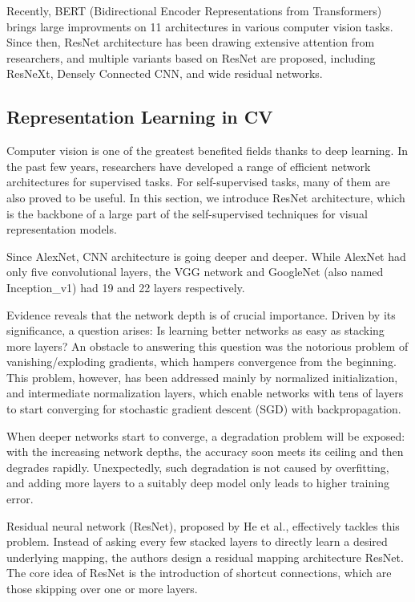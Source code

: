 \documentclass[conference]{IEEEtran}
\begin{document}
Recently, BERT (Bidirectional Encoder Representations from Transformers) brings large improvments on 11 architectures in various computer vision tasks. Since then, ResNet architecture has been drawing extensive attention from researchers, and multiple variants based on ResNet are proposed, including ResNeXt, Densely Connected CNN, and wide residual networks.

\subsection{Representation Learning in CV}
Computer vision is one of the greatest benefited fields thanks to deep learning. In the past few years, researchers have developed a range of efficient network architectures for supervised tasks.
For self-supervised tasks, many of them are also proved to be useful. In this section, we introduce ResNet architecture, which is the backbone of a large part of the self-supervised techniques for visual representation models.

Since AlexNet, CNN architecture is going deeper and deeper. While AlexNet had only five convolutional layers, the VGG network and GoogleNet (also named Inception\_v1) had 19 and 22 layers respectively.

Evidence reveals that the network depth is of crucial importance. Driven by its significance, a question arises: Is learning better networks as easy as stacking more layers?
An obstacle to answering this question was the notorious problem of vanishing/exploding gradients, which hampers convergence from the beginning. 
This problem, however, has been addressed mainly by normalized initialization, and intermediate normalization layers, which enable networks with tens of layers to start converging for stochastic gradient descent (SGD) with backpropagation.

When deeper networks start to converge, a degradation problem will be exposed: with the increasing network depths, the accuracy soon meets its ceiling and then degrades rapidly.
Unexpectedly, such degradation is not caused by overfitting, and adding more layers to a suitably deep model only leads to higher training error.

Residual neural network (ResNet), proposed by He et al., effectively tackles this problem.
Instead of asking every few stacked layers to directly learn a desired underlying mapping, the authors design a residual mapping architecture ResNet.
The core idea of ResNet is the introduction of shortcut connections, which are those skipping over one or more layers. 
\end{document}
